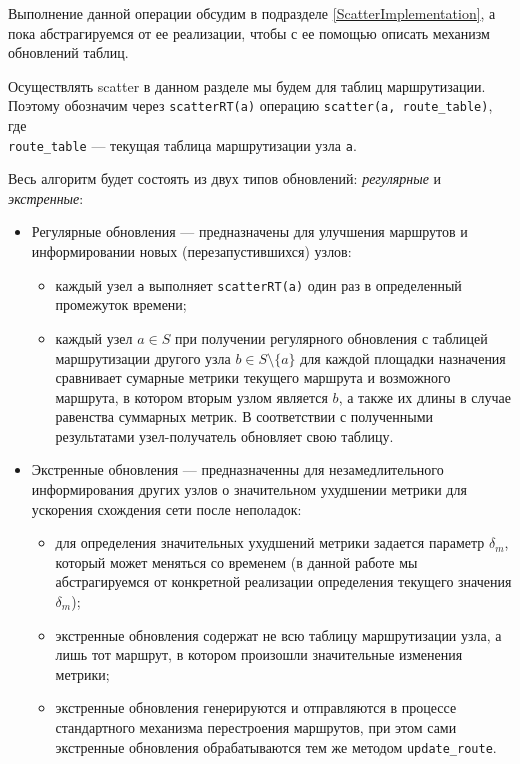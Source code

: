 \documentclass{article}
\theoremstyle{plain}
\theoremstyle{plain}
\theoremstyle{plain}
\theoremstyle{plain}
\theoremstyle{definition}
\theoremstyle{remark}
\theoremstyle{plain}
\begin{document}
Выполнение данной операции обсудим в подразделе \ref{ScatterImplementation}, а пока абстрагируемся от ее реализации, чтобы с ее помощью описать механизм обновлений таблиц.

Осуществлять scatter в данном разделе мы будем для таблиц маршрутизации. Поэтому обозначим через \texttt{scatterRT(a)} операцию \texttt{scatter(a, route\_table)}, где \\
\texttt{route\_table} --- текущая таблица маршрутизации узла \texttt{a}.

Весь алгоритм будет состоять из двух типов обновлений: \textit{регулярные} и \textit{экстренные}:

\begin{itemize}
    \item Регулярные обновления --- предназначены для улучшения маршрутов и информировании новых (перезапустившихся) узлов:
    
    \begin{itemize}
        \item каждый узел \texttt{a} выполняет \texttt{scatterRT(a)} один раз в определенный промежуток времени;
        
        \item каждый узел $a \in S$ при получении регулярного обновления с таблицей маршрутизации другого узла $b \in S \setminus \{a\}$ для каждой площадки назначения сравнивает сумарные метрики текущего маршрута и возможного маршрута, в котором вторым узлом является $b$, а также их длины в случае равенства суммарных метрик. В соответствии с полученными результатами узел-получатель обновляет свою таблицу.
    \end{itemize}
    
    \item Экстренные обновления --- предназначенны для незамедлительного информирования других узлов о значительном ухудшении метрики для ускорения схождения сети после неполадок:
    
    \begin{itemize}
        \item для определения значительных ухудшений метрики задается параметр $\delta_m$, который может меняться со временем (в данной работе мы абстрагируемся от конкретной реализации определения текущего значения $\delta_m$);
        
        \item экстренные обновления содержат не всю таблицу маршрутизации узла, а лишь тот маршрут, в котором произошли значительные изменения метрики;
        
        \item экстренные обновления генерируются и отправляются в процессе стандартного механизма перестроения маршрутов, при этом сами экстренные обновления обрабатываются тем же методом \texttt{update\_route}.
    \end{itemize}
\end{itemize}
\end{document}
